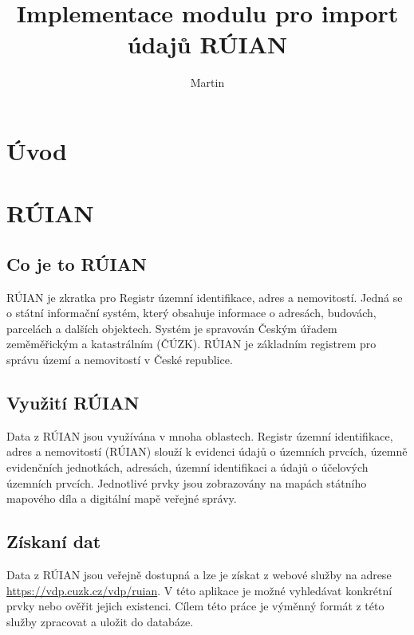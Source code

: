 \documentclass[czech, kiv, ba, he, iso690alph, pdf]{fasthesis}
\title{Implementace modulu pro import údajů RÚIAN}
\author{Martin}{Schön}
\begin{document}
\frontpages[tm]
\tableofcontents
\chapter{Úvod}

\chapter{RÚIAN}
\section{Co je to RÚIAN}
RÚIAN je zkratka pro Registr územní identifikace, adres a nemovitostí. 
Jedná se o státní informační systém, který obsahuje informace o adresách, budovách, parcelách a dalších objektech. 
Systém je spravován Českým úřadem zeměměřickým a katastrálním (ČÚZK). 
RÚIAN je základním registrem pro správu území a nemovitostí v České republice.

\section{Využití RÚIAN}
Data z RÚIAN jsou využívána v mnoha oblastech.
Registr územní identifikace, adres a nemovitostí (RÚIAN) slouží k evidenci údajů o územních prvcích, 
územně evidenčních jednotkách, adresách, územní identifikaci a údajů o účelových územních prvcích. 
Jednotlivé prvky jsou zobrazovány na mapách státního mapového díla a digitální mapě veřejné správy.

\section{Získaní dat}
Data z RÚIAN jsou veřejně dostupná a lze je získat z webové služby na adrese \url{https://vdp.cuzk.cz/vdp/ruian}.
V této aplikace je možné vyhledávat konkrétní prvky nebo ověřit jejich existenci.
Cílem této práce je výměnný formát z této služby zpracovat a uložit do databáze.
\end{document}

